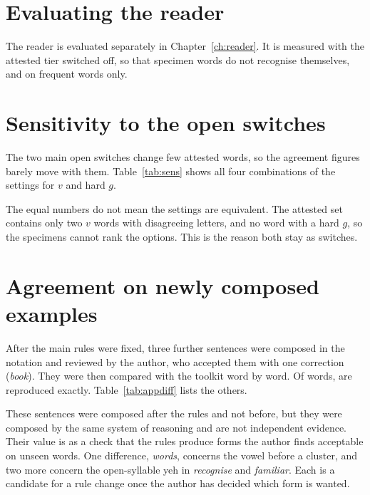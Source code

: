 \section{Evaluating the reader}
The reader is evaluated separately in Chapter~\ref{ch:reader}. It is measured with the attested tier switched off, so that specimen words do not recognise themselves, and on frequent words only.

\section{Sensitivity to the open switches}
The two main open switches change few attested words, so the agreement figures barely move with them. Table~\ref{tab:sens} shows all four combinations of the settings for $v$ and hard $g$.

\begin{table}[ht]\centering\small

\caption{Agreement with the \NAttested{} attested forms under each setting of $v$ and hard $g$.}\label{tab:sens}
\end{table}

The equal numbers do not mean the settings are equivalent. The attested set contains only two $v$ words with disagreeing letters, and no word with a hard $g$, so the specimens cannot rank the options. This is the reason both stay as switches.

\section{Agreement on newly composed examples}
After the main rules were fixed, three further sentences were composed in the notation and reviewed by the author, who accepted them with one correction (\emph{book}). They were then compared with the toolkit word by word. Of \NApprovedWords{} words, \NApprovedSame{} are reproduced exactly. Table~\ref{tab:appdiff} lists the others.

\begin{table}[ht]\centering\small

\caption{Words in the approved sentences that the toolkit writes differently.}\label{tab:appdiff}
\end{table}

These sentences were composed after the rules and not before, but they were composed by the same system of reasoning and are not independent evidence. Their value is as a check that the rules produce forms the author finds acceptable on unseen words. One difference, \emph{words}, concerns the vowel before a cluster, and two more concern the open-syllable yeh in \emph{recognise} and \emph{familiar}. Each is a candidate for a rule change once the author has decided which form is wanted.

